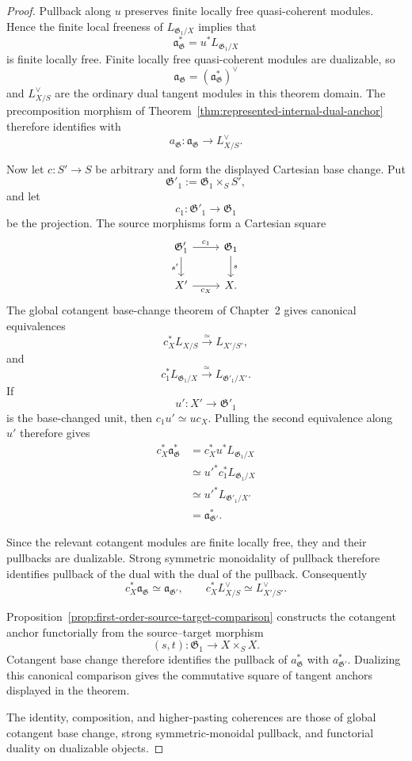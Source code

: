 \begin{proof}
Pullback along $u$ preserves finite locally free quasi-coherent modules.
Hence the finite local freeness of
$L_{\mathfrak G_1/X}$ implies that
\[
    \mathfrak a_{\mathfrak G}^{*}
    =
    u^*L_{\mathfrak G_1/X}
\]
is finite locally free.  Finite locally free quasi-coherent modules are
dualizable, so
\[
    \mathfrak a_{\mathfrak G}
    =
    \left(
        \mathfrak a_{\mathfrak G}^{*}
    \right)^\vee
\]
and $L_{X/S}^{\vee}$ are the ordinary dual tangent modules in this theorem
domain.  The precomposition morphism of
Theorem~\ref{thm:represented-internal-dual-anchor} therefore identifies with
\[
    a_{\mathfrak G}:
    \mathfrak a_{\mathfrak G}
    \longrightarrow
    L_{X/S}^{\vee}.
\]

Now let $c:S'\to S$ be arbitrary and form the displayed Cartesian base
change.  Put
\[
    \mathfrak G'_1
    :=
    \mathfrak G_1\times_SS',
\]
and let
\[
    c_1:\mathfrak G'_1\longrightarrow\mathfrak G_1
\]
be the projection.  The source morphisms form a Cartesian square
\[
\begin{tikzcd}
\mathfrak G'_1 \arrow[r,"c_1"] \arrow[d,"s'"'] &
\mathfrak G_1 \arrow[d,"s"]\\
X' \arrow[r,"c_X"'] &
X.
\end{tikzcd}
\]
The global cotangent base-change theorem of Chapter~2 gives canonical
equivalences
\[
    c_X^*L_{X/S}
    \xrightarrow{\simeq}
    L_{X'/S'},
\]
and
\[
    c_1^*L_{\mathfrak G_1/X}
    \xrightarrow{\simeq}
    L_{\mathfrak G'_1/X'}.
\]
If
\[
    u':X'\longrightarrow\mathfrak G'_1
\]
is the base-changed unit, then
$c_1u'\simeq uc_X$.  Pulling the second equivalence along $u'$ therefore
gives
\[
\begin{aligned}
    c_X^*\mathfrak a_{\mathfrak G}^{*}
    &=
    c_X^*u^*L_{\mathfrak G_1/X}\\
    &\simeq
    u'^*c_1^*L_{\mathfrak G_1/X}\\
    &\simeq
    u'^*L_{\mathfrak G'_1/X'}\\
    &=
    \mathfrak a_{\mathfrak G'}^{*}.
\end{aligned}
\]

Since the relevant cotangent modules are finite locally free, they and their
pullbacks are dualizable.  Strong symmetric monoidality of pullback therefore
identifies pullback of the dual with the dual of the pullback.  Consequently
\[
    c_X^*\mathfrak a_{\mathfrak G}
    \simeq
    \mathfrak a_{\mathfrak G'},
    \qquad
    c_X^*L_{X/S}^{\vee}
    \simeq
    L_{X'/S'}^{\vee}.
\]

Proposition~\ref{prop:first-order-source-target-comparison} constructs the
cotangent anchor functorially from the source--target morphism
\[
    (s,t):\mathfrak G_1\longrightarrow X\times_SX.
\]
Cotangent base change therefore identifies the pullback of
$a_{\mathfrak G}^{*}$ with
$a_{\mathfrak G'}^{*}$.  Dualizing this canonical comparison gives the
commutative square of tangent anchors displayed in the theorem.

The identity, composition, and higher-pasting coherences are those of global
cotangent base change, strong symmetric-monoidal pullback, and functorial
duality on dualizable objects.
\end{proof}

